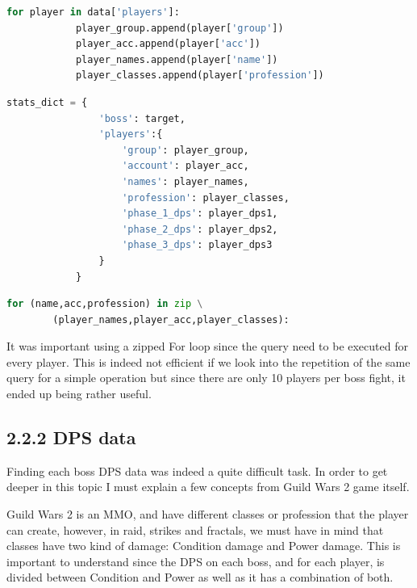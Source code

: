 \documentclass[12pt,a4paper]{article}
\begin{document}
    \begin{lstlisting}[language=Python, caption={\textbf{Basic player data loop}},captionpos=!b]
        for player in data['players']:
            player_group.append(player['group'])
            player_acc.append(player['acc'])
            player_names.append(player['name'])
            player_classes.append(player['profession'])
    \end{lstlisting}
    \begin{lstlisting}[language=Python, caption={\textbf{Custom Python stat dictionary}},captionpos=!b]
        stats_dict = {
                'boss': target,
                'players':{
                    'group': player_group,
                    'account': player_acc,
                    'names': player_names,
                    'profession': player_classes,
                    'phase_1_dps': player_dps1,
                    'phase_2_dps': player_dps2,
                    'phase_3_dps': player_dps3
                }
            }
    \end{lstlisting}
    
    \begin{lstlisting}[language=Python, caption={\textbf{Zipped data for SQLite query}},captionpos=!b]
        for (name,acc,profession) in zip \
        (player_names,player_acc,player_classes):
    \end{lstlisting}

    It was important using a zipped For loop since the query need to be executed for every player.
    This is indeed not efficient if we look into the repetition of the same query for a simple operation
    but since there are only 10 players per boss fight, it ended up being rather useful.

    \newpage

    \subsection*{\normalsize 2.2.2 DPS data}
    Finding each boss DPS data was indeed a quite difficult task. In order to get deeper in this topic
    I must explain a few concepts from Guild Wars 2 game itself.

    Guild Wars 2 is an MMO, and have different classes or profession that the player can create, however, in
    raid, strikes and fractals, we must have in mind that classes have two kind of damage: Condition damage
    and Power damage. This is important to understand since the DPS on each boss, and for each player, is divided
    between Condition and Power as well as it has a combination of both.
\end{document}
